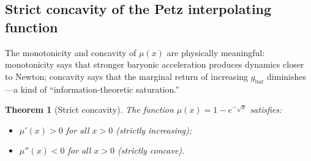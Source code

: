 \documentclass[prd,twocolumn,superscriptaddress,longbibliography,floatfix]{revtex4-2}
\newtheorem{theorem}{Theorem}
\begin{document}
\subsection{Strict concavity of the Petz interpolating function}
\label{sec:concavity}

The monotonicity and concavity of $\mu(x)$ are physically meaningful:
monotonicity says that stronger baryonic acceleration produces
dynamics closer to Newton; concavity says that the marginal return of
increasing $g_{\mathrm{bar}}$ diminishes---a kind of
``information-theoretic saturation.''

\begin{theorem}[Strict concavity]
\label{thm:concavity}
The function $\mu(x) = 1 - e^{-\sqrt{x}}$ satisfies:
\begin{itemize}
  \item[\textup{(a)}] $\mu'(x) > 0$ for all $x > 0$
    \textup{(strictly increasing)};
  \item[\textup{(b)}] $\mu''(x) < 0$ for all $x > 0$
    \textup{(strictly concave)}.
\end{itemize}
\end{theorem}
\end{document}
